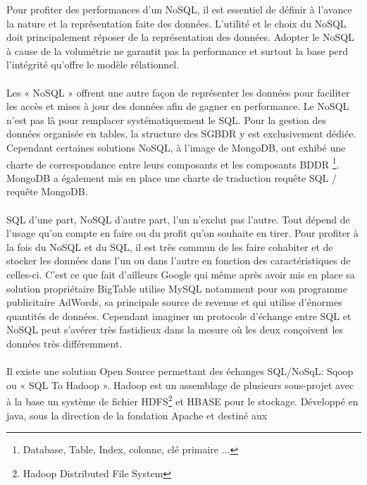 Pour profiter des performances d'un \textsf{NoSQL}, il est essentiel
de définir à l'avance la nature et la représentation faite des données.
L'utilité et le choix du \textsf{NoSQL} doit principalement
réposer de la représentation des données. Adopter le \textsf{NoSQL} à
cause de la volumétrie ne garantit pas la performance et surtout la 
base perd l'intégrité qu'offre le modèle rélationnel.  
\\ 
\\ 
Les « \textsf{NoSQL} » offrent une autre façon
de représenter les données pour faciliter les accès et mises à jour des
données afin de gagner en performance. Le \textsf{NoSQL} n'est pas 
là pour remplacer systématiquement le  \textsf{SQL}. Pour la gestion des données 
organisée en tables, la structure des \textsf{SGBDR} y est exclusivement
dédiée. Cependant certaines solutions \textsf{NoSQL}, à l'image de \textsf{MongoDB}, ont
exhibé une charte de correspondance entre leurs composants et les composants \textsf{BDDR} 
\footnote{Database, Table, Index, colonne, clé
  primaire ...}. \textsf{MongoDB} a également mis
en place une charte de traduction requête \textsf{SQL} / requête
\textsf{MongoDB}.
\\
\\
\textsf{SQL} d'une part, \textsf{NoSQL} d'autre part, l'un n'exclut pas l'autre.
Tout dépend de l'usage qu'on compte en faire ou du profit qu'on
souhaite en tirer. Pour profiter à la fois du \textsf{NoSQL} et du \textsf{SQL}, il est très commun
de les faire cohabiter et de stocker
les données dans l'un ou dans l'autre en fonction des caractéristiques de 
celles-ci. C'est ce que fait d'ailleurs \textsf{Google} qui
même après avoir mis en place sa solution
propriétaire \textsf{BigTable} utilise \textsf{MySQL}
notamment pour son programme publicitaire \textsf{AdWords}, sa
principale source de revenue et qui utilise d'énormes quantités de
données. Cependant imaginer un protocole d'échange entre \textsf{SQL}
et \textsf{NoSQL} peut s'avérer très fastidieux dans la mesure où les
deux conçoivent les données très différemment.
\\
\\
Il existe une solution \textsf{Open Source} permettant des échanges
\textsf{SQL}/\textsf{NoSqL}: \textsf{Sqoop} ou « SQL To Hadoop
». \textsf{Hadoop} est un assemblage de plusieurs
sous-projet avec à la base un système de
fichier \textsf{HDFS}\footnote{Hadoop Distributed File System}
et \textsf{HBASE} pour le stockage. Développé en \textsf{java}, sous
la direction de la fondation \textsf{Apache} et destiné aux
